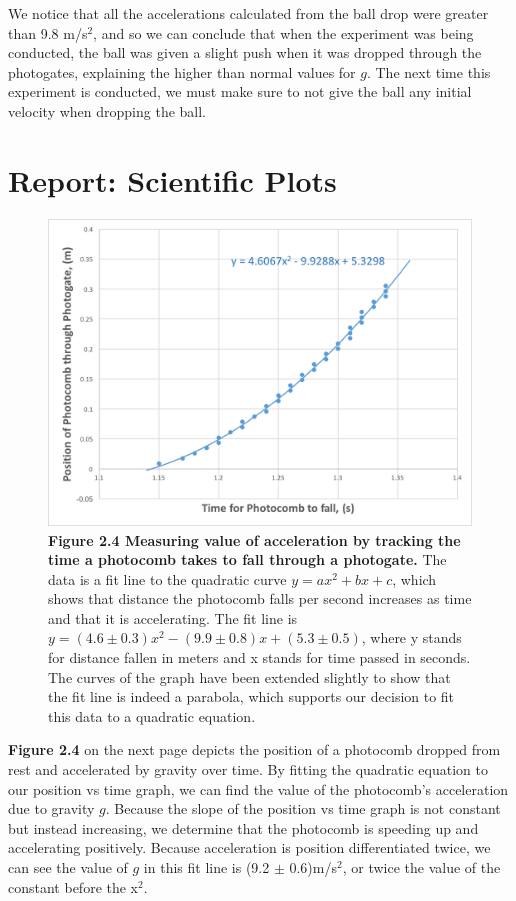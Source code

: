 \documentclass[11pt]{report}
\begin{document}
We notice that all the accelerations calculated from the ball drop were greater
than 9.8 m/s$^2$, and so we can conclude that when the experiment was being
conducted, the ball was given a slight push when it was dropped through the
photogates, explaining the higher than normal values for \(g\).  The next time
this experiment is conducted, we must make sure to not give the ball any
initial velocity when dropping the ball.

\section*{Report: Scientific Plots}
\begin{figure}[h!]
    \includegraphics[width=\linewidth]{Photocomb2.png}
    \captionsetup{labelformat=empty}
    \caption{\textbf{Figure 2.4  Measuring value of acceleration by tracking the
    time a photocomb takes to fall through a photogate.}  The data is a fit line
    to the quadratic curve \(y = ax^2 + bx + c\), which shows that distance the 
    photocomb falls per second increases as time and that it is accelerating.  
    The fit line is \(y = (4.6 \pm 0.3)x^2 - (9.9 \pm 0.8)x + (5.3 \pm 0.5)\), 
    where y stands for distance fallen in meters and x stands for time passed in
    seconds. The curves
of the graph have been extended slightly to show that the fit line is indeed a
parabola, which supports our decision to fit this data to a quadratic equation.}
\end{figure}

\textbf{Figure 2.4} on the next page depicts the position of a photocomb dropped from
rest and accelerated by gravity over time.  By fitting the quadratic equation 
to our position vs time graph, we can find the value of the photocomb's 
acceleration due to gravity \(g\). Because the slope of the position vs time
graph is not constant but instead increasing, we determine that the photocomb is
speeding up and accelerating positively.  Because acceleration is position 
differentiated twice, we can see the value of \(g\) in this fit line is 
(9.2 $\pm$ 0.6)m/s$^2$, or twice the value of the constant before the x$^2$.  
\end{document}
